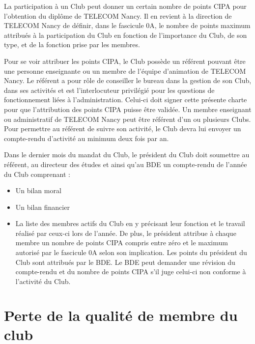\documentclass{article} %
\begin{document}
\begin{multicols}{2}
		{\small

			La participation à un Club peut donner un certain nombre de
			points CIPA pour l’obtention du diplôme de TELECOM
			Nancy. Il en revient à la direction de TELECOM Nancy de
			définir, dans le fascicule 0A, le nombre de points maximum
			attribués à la participation du Club en fonction de
			l’importance du Club, de son type, et de la fonction prise par
			les membres.

			Pour se voir attribuer les points CIPA, le Club possède un
			référent pouvant être une personne enseignante ou un
			membre de l’équipe d’animation de TELECOM Nancy. Le
			référent a pour rôle de conseiller le bureau dans la gestion
			de son Club, dans ses activités et est l’interlocuteur privilégié
			pour les questions de fonctionnement liées à
			l’administration. Celui-ci doit signer cette présente charte
			pour que l’attribution des points CIPA puisse être validée.
			Un membre enseignant ou administratif de TELECOM Nancy
			peut être référent d’un ou plusieurs Clubs. Pour permettre
			au référent de suivre son activité, le Club devra lui envoyer
			un compte-rendu d’activité au minimum deux fois par an.

			Dans le dernier mois du mandat du Club, le président du
			Club doit soumettre au référent, au directeur des études et
			ainsi qu’au BDE un compte-rendu de l’année du Club
			comprenant :

			\begin{itemize}
				\item Un bilan moral
				\item Un bilan financier
				\item La liste des membres actifs du Club en y précisant
					leur fonction et le travail réalisé par ceux-ci lors de
					l’année. De plus, le président attribue à chaque
					membre un nombre de points CIPA compris entre
					zéro et le maximum autorisé par le fascicule 0A
					selon son implication. Les points du président du
					Club sont attribués par le BDE.
					Le BDE peut demander une révision du compte-rendu et du
					nombre de points CIPA s’il juge celui-ci non conforme à
					l’activité du Club.
			\end{itemize}

		}
		
		\section{Perte de la qualité de membre du club}


\end{multicols}
\end{document}
